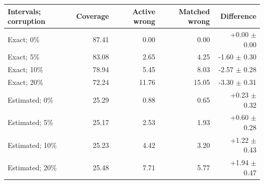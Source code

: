 \begin{tabular}{@{}lrrrr@{}}\toprule
Intervals; corruption & Coverage & Active wrong & Matched wrong & Difference\\\midrule
Exact; 0\% & 87.41 & 0.00 & 0.00 & +0.00 $\pm$ 0.00 \\
Exact; 5\% & 83.08 & 2.65 & 4.25 & -1.60 $\pm$ 0.30 \\
Exact; 10\% & 78.94 & 5.45 & 8.03 & -2.57 $\pm$ 0.28 \\
Exact; 20\% & 72.24 & 11.76 & 15.05 & -3.30 $\pm$ 0.31 \\
Estimated; 0\% & 25.29 & 0.88 & 0.65 & +0.23 $\pm$ 0.32 \\
Estimated; 5\% & 25.17 & 2.53 & 1.93 & +0.60 $\pm$ 0.28 \\
Estimated; 10\% & 25.23 & 4.42 & 3.20 & +1.22 $\pm$ 0.43 \\
Estimated; 20\% & 25.48 & 7.71 & 5.77 & +1.94 $\pm$ 0.47 \\
\bottomrule\end{tabular}
